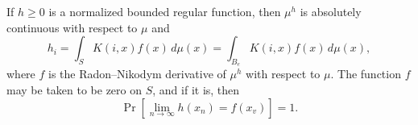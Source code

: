 If $h \geq 0$ is a normalized bounded regular function, then $\mu^h$ is absolutely continuous with respect to $\mu$ and
$$h_i = \int_{S} K(i, x) f(x) \, d\mu(x) = \int_{B_e} K(i, x) f(x) \, d\mu(x),$$
where $f$ is the Radon--Nikodym derivative of $\mu^h$ with respect to $\mu$. The function $f$ may be taken to be zero on $S$, and if it is, then
$$\Pr[\lim_{n \to \infty} h(x_n) = f(x_v)] = 1.$$
